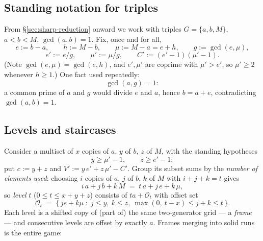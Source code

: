 \documentclass[11pt,reqno]{amsart}
\theoremstyle{plain}
\theoremstyle{definition}
\theoremstyle{remark}
\begin{document}
\subsection{Standing notation for triples}\label{sec:triple-notation}

From \S\ref{sec:sharp-reduction} onward we work with triples $G = \{a, b, M\}$,
$a < b < M$, $\gcd(a, b) = 1$. Fix, once and for all,
\[
  e := b - a, \qquad h := M - b, \qquad \mu := M - a = e + h, \qquad
  g := \gcd(e, \mu) ,
\]
\[
  e' := e/g, \qquad \mu' := \mu/g, \qquad C' := (e' - 1)(\mu' - 1) .
\]
(Note $\gcd(e, \mu) = \gcd(e, h)$, and $e', \mu'$ are coprime with $\mu' > e'$,
so $\mu' \ge 2$ whenever $h \ge 1$.) One fact used repeatedly:
\[
  \gcd(a, g) = 1 :
\]
a common prime of $a$ and $g$ would divide $e$ and $a$, hence $b = a + e$,
contradicting $\gcd(a, b) = 1$.

\subsection{Levels and staircases}

Consider a multiset of $x$ copies of $a$, $y$ of $b$, $z$ of $M$, with the standing
hypotheses
\[
  y \ge \mu' - 1, \qquad z \ge e' - 1 ;
\]
put $c := y + z$ and $V' := y\,e' + z\,\mu' - C'$. Group its subset sums by the
\emph{number of elements used}: choosing $i$ copies of $a$, $j$ of $b$, $k$ of $M$
with $i + j + k = t$ gives
\[
  i\,a + j\,b + k\,M \;=\; t\,a + j\,e + k\,\mu ,
\]
so \emph{level} $t$ ($0 \le t \le x + y + z$) consists of $t a + \mathcal{O}_t$
with offset set
\[
  \mathcal{O}_t \;=\; \{\, je + k\mu \;:\; j \le y,\ k \le z,\ \max(0,\ t - x) \le
  j + k \le t \,\} .
\]
Each level is a shifted copy of (part of) the same two-generator grid --- a
\emph{frame} --- and consecutive levels are offset by exactly $a$. Frames merging
into solid runs is the entire game:
\end{document}
